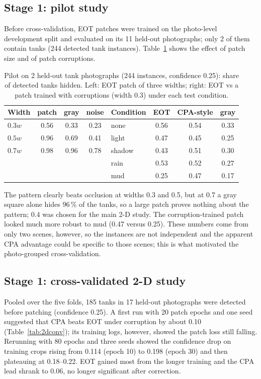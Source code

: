 \documentclass[11pt,a4paper]{article}
\begin{document}
\subsection{Stage 1: pilot study}\label{sec:res-pilot}
Before cross-validation, EOT patches were trained on the photo-level development split and evaluated on its 11 held-out photographs; only 2 of them contain tanks (244 detected tank instances). Table~\ref{tab:pilot} shows the effect of patch size and of patch corruptions.

\begin{table}[htbp]
\centering\small
\caption{Pilot on 2 held-out tank photographs (244 instances, confidence 0.25): share of detected tanks hidden. Left: EOT patch of three widths; right: EOT vs a patch trained with corruptions (width 0.3) under each test condition.}
\label{tab:pilot}
\setlength{\tabcolsep}{4pt}
\begin{tabular}{@{}lccc@{\hspace{1.2em}}lccc@{}}
\toprule
Width & patch & gray & noise & Condition & EOT & CPA-style & gray \\
\midrule
$0.3w$ & 0.56 & 0.33 & 0.23 & none & 0.56 & 0.54 & 0.33 \\
$0.5w$ & 0.96 & 0.69 & 0.41 & light & 0.47 & 0.45 & 0.25 \\
$0.7w$ & 0.98 & 0.96 & 0.78 & shadow & 0.43 & 0.51 & 0.30 \\
 & & & & rain & 0.53 & 0.52 & 0.27 \\
 & & & & mud & 0.25 & 0.47 & 0.17 \\
\bottomrule
\end{tabular}
\end{table}

The pattern clearly beats occlusion at widths 0.3 and 0.5, but at 0.7 a gray square alone hides 96\,\% of the tanks, so a large patch proves nothing about the pattern; 0.4 was chosen for the main 2-D study. The corruption-trained patch looked much more robust to mud (0.47 versus 0.25). These numbers come from only two scenes, however, so the instances are not independent and the apparent CPA advantage could be specific to those scenes; this is what motivated the photo-grouped cross-validation.

\subsection{Stage 1: cross-validated 2-D study}\label{sec:res-2d}
Pooled over the five folds, 185 tanks in 17 held-out photographs were detected before patching (confidence 0.25). A first run with 20 patch epochs and one seed suggested that CPA beats EOT under corruption by about 0.10 (Table~\ref{tab:2dconv}); its training logs, however, showed the patch loss still falling. Rerunning with 80 epochs and three seeds showed the confidence drop on training crops rising from 0.114 (epoch 10) to 0.198 (epoch 30) and then plateauing at 0.18--0.22. EOT gained most from the longer training and the CPA lead shrank to 0.06, no longer significant after correction.
\end{document}
